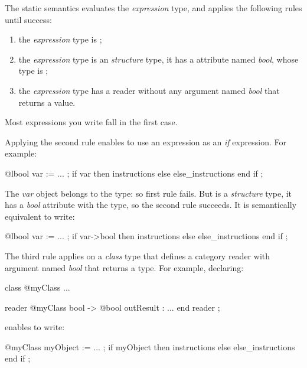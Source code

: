 The static semantics evaluates the \emph{expression} type, and applies the following rules until success:
\begin{enumerate}
\item the \emph{expression} type is ;
\item the \emph{expression} type is an \emph{structure} type, it has a attribute named \emph{bool}, whose type is ;
\item the \emph{expression} type has a reader without any argument named \emph{bool} that returns a  value.
\end{enumerate}

Most expressions you write fall in the first case.

Applying the second rule enables to use an  expression as an \emph{if} expression. For example:
{
\begin{galgascode}
@lbool var := ... ;
if var then
  instructions
else
  else_instructions
end if ;
\end{galgascode}
}

The \emph{var} object belongs to the  type: so first rule fails. But  is a \emph{structure} type, it has a \emph{bool} attribute with the  type, so the second rule succeeds. It is semantically equivalent to write:
{
\begin{galgascode}
@lbool var := ... ;
if var->bool then
  instructions
else
  else_instructions
end if ;
\end{galgascode}
}

The third rule applies on a \emph{class} type that defines a category reader with argument named \emph{bool} that returns a  type. For example, declaring:
\begin{galgascode}
class @myClass { ... }

reader @myClass bool -> @bool outResult : ... end reader ;
\end{galgascode}

enables to write:
{
\begin{galgascode}
@myClass myObject := ... ;
if myObject then
  instructions
else
  else_instructions
end if ;
\end{galgascode}
}

